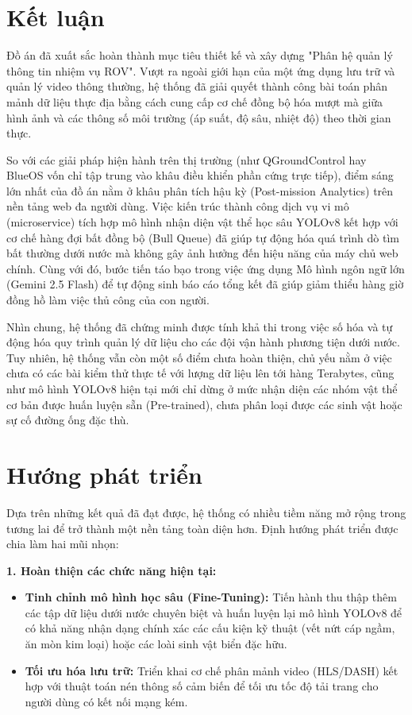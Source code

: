 \documentclass[../DoAn.tex]{subfiles}
\begin{document}
\section{Kết luận}
Đồ án đã xuất sắc hoàn thành mục tiêu thiết kế và xây dựng "Phân hệ quản lý thông tin nhiệm vụ ROV". Vượt ra ngoài giới hạn của một ứng dụng lưu trữ và quản lý video thông thường, hệ thống đã giải quyết thành công bài toán phân mảnh dữ liệu thực địa bằng cách cung cấp cơ chế đồng bộ hóa mượt mà giữa hình ảnh và các thông số môi trường (áp suất, độ sâu, nhiệt độ) theo thời gian thực. 

So với các giải pháp hiện hành trên thị trường (như QGroundControl hay BlueOS vốn chỉ tập trung vào khâu điều khiển phần cứng trực tiếp), điểm sáng lớn nhất của đồ án nằm ở khâu phân tích hậu kỳ (Post-mission Analytics) trên nền tảng web đa người dùng. Việc kiến trúc thành công dịch vụ vi mô (microservice) tích hợp mô hình nhận diện vật thể học sâu YOLOv8 kết hợp với cơ chế hàng đợi bất đồng bộ (Bull Queue) đã giúp tự động hóa quá trình dò tìm bất thường dưới nước mà không gây ảnh hưởng đến hiệu năng của máy chủ web chính. Cùng với đó, bước tiến táo bạo trong việc ứng dụng Mô hình ngôn ngữ lớn (Gemini 2.5 Flash) để tự động sinh báo cáo tổng kết đã giúp giảm thiểu hàng giờ đồng hồ làm việc thủ công của con người.

Nhìn chung, hệ thống đã chứng minh được tính khả thi trong việc số hóa và tự động hóa quy trình quản lý dữ liệu cho các đội vận hành phương tiện dưới nước. Tuy nhiên, hệ thống vẫn còn một số điểm chưa hoàn thiện, chủ yếu nằm ở việc chưa có các bài kiểm thử thực tế với lượng dữ liệu lên tới hàng Terabytes, cũng như mô hình YOLOv8 hiện tại mới chỉ dừng ở mức nhận diện các nhóm vật thể cơ bản được huấn luyện sẵn (Pre-trained), chưa phân loại được các sinh vật hoặc sự cố đường ống đặc thù.

\section{Hướng phát triển}
Dựa trên những kết quả đã đạt được, hệ thống có nhiều tiềm năng mở rộng trong tương lai để trở thành một nền tảng toàn diện hơn. Định hướng phát triển được chia làm hai mũi nhọn:

\textbf{1. Hoàn thiện các chức năng hiện tại:}
\begin{itemize}
    \item \textbf{Tinh chỉnh mô hình học sâu (Fine-Tuning):} Tiến hành thu thập thêm các tập dữ liệu dưới nước chuyên biệt và huấn luyện lại mô hình YOLOv8 để có khả năng nhận dạng chính xác các cấu kiện kỹ thuật (vết nứt cáp ngầm, ăn mòn kim loại) hoặc các loài sinh vật biển đặc hữu.
    \item \textbf{Tối ưu hóa lưu trữ:} Triển khai cơ chế phân mảnh video (HLS/DASH) kết hợp với thuật toán nén thông số cảm biến để tối ưu tốc độ tải trang cho người dùng có kết nối mạng kém.
\end{itemize}
\end{document}
